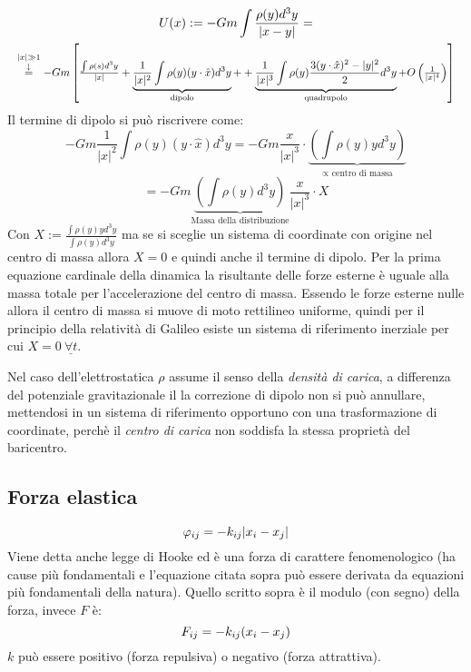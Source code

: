 \documentclass[Main.tex]{subfiles}
\begin{document}
\begin{gather}
	U(x):= - Gm \int \frac{\rho(y) d^3y }{|x-y|}= \\ \notag
	\resizebox{1\textwidth}{!}{$ \overset{|x| \gg 1}{\overset{\downarrow}{=}} -Gm \left[ \frac{\int \rho(s) d^3y}{|x|} + \underbrace{\frac{1}{|x|^2} \int \rho(y) ( y \cdot \hat x) d^3y}_{\text{dipolo}}  +  +\underbrace{\frac{1}{|x|^3} \int \rho(y) \frac{3 ( y \cdot \hat x)^2 - |y|^2}{2} d^3y}_{\text{quadrupolo}} + O\left( \frac{1}{|x|^4} \right) \right]$}
\end{gather}
Il termine di dipolo si può riscrivere come:
\begin{equation}
	-Gm \frac{1}{|x|^2} \int \rho(y) (y \cdot \hat x) d^3 y = -Gm \frac{x}{|x|^3} \cdot \underbrace{\left( \int \rho (y) y d^3 y \right)}_{\propto \text{ centro di massa}}
\end{equation}
\begin{equation}
	=- Gm \underbrace{\left( \int \rho(y) d^3 y \right)}_{\text{Massa della distribuzione}} \frac{x}{|x|^3} \cdot X
\end{equation}
Con $X:= \frac{\int \rho(y) y d^3y}{\int \rho(y) d^3y}$ ma se si sceglie un sistema di coordinate con origine nel centro di massa allora $X=0$ e quindi anche il termine di dipolo. Per la prima equazione cardinale della dinamica la risultante delle forze esterne è uguale alla massa totale per l'accelerazione del centro di massa. Essendo le forze esterne nulle allora il centro di massa si muove di moto rettilineo uniforme, quindi per il principio della relatività di Galileo esiste un sistema di riferimento inerziale per cui $X=0 \ \underline{\forall t}$. 

\begin{osservazione}
Nel caso dell'elettrostatica $\rho$ assume il senso della \emph{densità di carica}, a differenza del potenziale gravitazionale il la correzione di dipolo non si può annullare, mettendosi in un sistema di riferimento opportuno con una trasformazione di coordinate, perchè il \emph{centro di carica} non soddisfa la stessa proprietà del baricentro.
\end{osservazione}

\newpage
\subsection{Forza elastica}
\begin{equation}
	\varphi_{ij}=-k_{ij}|x_i-x_j| \notag
\end{equation}
Viene detta anche legge di Hooke ed è una forza di carattere fenomenologico (ha cause più fondamentali e l'equazione citata sopra può essere derivata da equazioni più fondamentali della natura). Quello scritto sopra è il modulo (con segno) della forza, invece $F$ è:
\begin{equation}
	F_{ij}=-k_{ij}(x_i-x_j) \notag
\end{equation}
$k$ può essere positivo (forza repulsiva) o negativo (forza attrattiva).
\end{document}
